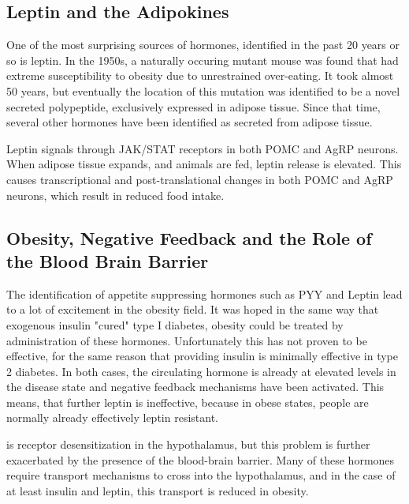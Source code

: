 \documentclass{tufte-handout}
\begin{document}
\subsection{Leptin and the Adipokines}

One of the most surprising sources of hormones, identified in the past 20 years or so is leptin.  In the 1950s, a naturally occuring mutant mouse was found that had extreme susceptibility to obesity due to unrestrained over-eating\cite{Ingalls1950}.  It took almost 50 years, but eventually the location of this mutation was identified to be a novel secreted polypeptide, exclusively expressed in adipose tissue\cite{Zhang1994}.  Since that time, several other hormones have been identified as secreted from adipose tissue.

  Leptin signals through JAK/STAT receptors in both POMC and AgRP neurons.  When adipose tissue expands, and animals are fed, leptin release is elevated.  This causes transcriptional and post-translational changes in both POMC and AgRP neurons, which result in reduced food intake.

\subsection{Obesity, Negative Feedback and the Role of the Blood Brain Barrier}

The identification of appetite suppressing hormones such as PYY and Leptin lead to a lot of excitement in the obesity field.  It was hoped in the same way that exogenous insulin "cured" type I diabetes, obesity could be treated by administration of these hormones.  Unfortunately this has not proven to be effective, for the same reason that providing insulin is minimally effective in type 2 diabetes.  In both cases, the circulating hormone is already at elevated levels in the disease state and negative feedback mechanisms have been activated.  This means, that further leptin is ineffective, because in obese states, people are normally already effectively leptin resistant.

 is receptor desensitization in the hypothalamus, but this problem is further exacerbated by the presence of the blood-brain barrier.  Many of these hormones require transport mechanisms to cross into the hypothalamus, and in the case of at least insulin and leptin, this transport is reduced in obesity.
\end{document}
